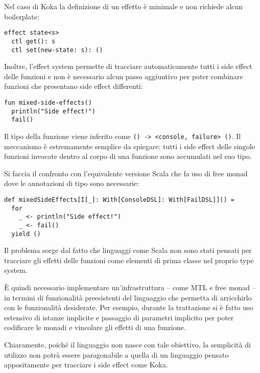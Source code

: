 Nel caso di Koka la definizione di un effetto è minimale e non richiede alcun boilerplate:
\begin{lstlisting}[language=koka]
effect state<s>
  ctl get(): s
  ctl set(new-state: s): ()
\end{lstlisting}

Inoltre, l'effect system permette di tracciare automaticamente tutti i side effect delle funzioni e non è necessario alcun passo aggiuntivo per poter combinare funzioni che presentano side effect differenti:
\begin{lstlisting}[language=koka]
fun mixed-side-effects()
  println("Side effect!")
  fail()
\end{lstlisting}
Il tipo della funzione viene inferito come \lstinline{() -> <console, failure> ()}. Il meccanismo è estremamente semplice da spiegare: tutti i side effect delle singole funzioni invocate dentro al corpo di una funzione sono accumulati nel suo tipo.

Si faccia il confronto con l'equivalente versione Scala che fa uso di free monad dove le annotazioni di tipo sono necessarie:
\begin{lstlisting}[language=scala3]
def mixedSideEffects[I[_]: With[ConsoleDSL]: With[FailDSL]]() =
  for
    _ <- println("Side effect!")
    _ <- fail()
  yield ()
\end{lstlisting}

Il problema sorge dal fatto che linguaggi come Scala non sono stati pensati per tracciare gli effetti delle funzioni come elementi di prima classe nel proprio type system.

È quindi necessario implementare un'infrastruttura -- come MTL e free monad -- in termini di funzionalità preesistenti del linguaggio che permetta di arricchirlo con le funzionalità desiderate. Per esempio, durante la trattazione si è fatto uso estensivo di istanze implicite e passaggio di parametri implicito per poter codificare le monadi e vincolare gli effetti di una funzione.

Chiaramente, poiché il linguaggio non nasce con tale obiettivo, la semplicità di utilizzo non potrà essere paragonabile a quella di un linguaggio pensato appositamente per tracciare i side effect come Koka.

